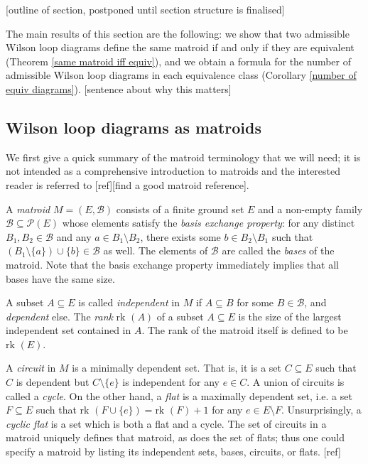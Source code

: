 \documentclass[11pt]{article}
\newcommand{\rk}{\textrm{rk }}
\newcommand{\cP}{\mathcal{P}}
\newcommand{\cB}{\mathcal{B}}
\theoremstyle{remark}
\theoremstyle{definition}
\begin{document}
[outline of section, postponed until section structure is finalised]

The main results of this section are the following: we show that two admissible Wilson loop diagrams define the same matroid if and only if they are equivalent (Theorem \ref{same matroid iff equiv}), and we obtain a formula for the number of admissible Wilson loop diagrams in each equivalence class (Corollary \ref{number of equiv diagrams}).  [sentence about why this matters]


\subsection{Wilson loop diagrams as matroids}\label{sec matroid background}

We first give a quick summary of the matroid terminology that we will need; it is not intended as a comprehensive introduction to matroids and the interested reader is referred to [ref][find a good matroid reference].

A {\em matroid} $M = (E,\cB)$ consists of a finite ground set $E$ and a non-empty family $\cB \subseteq \cP(E)$ whose elements satisfy the {\em basis exchange property}: for any distinct $B_1,B_2 \in \cB$ and any $a \in B_1 \setminus B_2$, there exists some $b \in B_2 \setminus B_1$ such that $(B_1 \setminus \{a\})\cup \{b\} \in \cB$ as well. The elements of $\cB$ are called the {\em bases} of the matroid. Note that the basis exchange property immediately implies that all bases have the same size.

A subset $A \subseteq E$ is called {\em independent} in $M$ if $A \subseteq B$ for some $B \in \cB$, and {\em dependent} else. The {\em rank}  $\rk(A)$ of a subset $A \subseteq E$ is the size of the largest independent set contained in $A$. The rank of the matroid itself is defined to be $\rk(E)$.

A {\em circuit} in $M$ is a minimally dependent set. That is, it is a set $C \subseteq E$ such that $C$ is dependent but $C \setminus \{e\}$ is independent for any $e \in C$. A union of circuits is called a {\em cycle}. On the other hand, a {\em flat} is a maximally dependent set, i.e. a set $F \subseteq E$ such that $\rk(F \cup \{e\}) = \rk(F) + 1$ for any $e \in E \setminus F$. Unsurprisingly, a {\em cyclic flat} is a set which is both a flat and a cycle. The set of circuits in a matroid uniquely defines that matroid, as does the set of flats; thus one could specify a matroid by listing its independent sets, bases, circuits, or flats. [ref]
\end{document}
